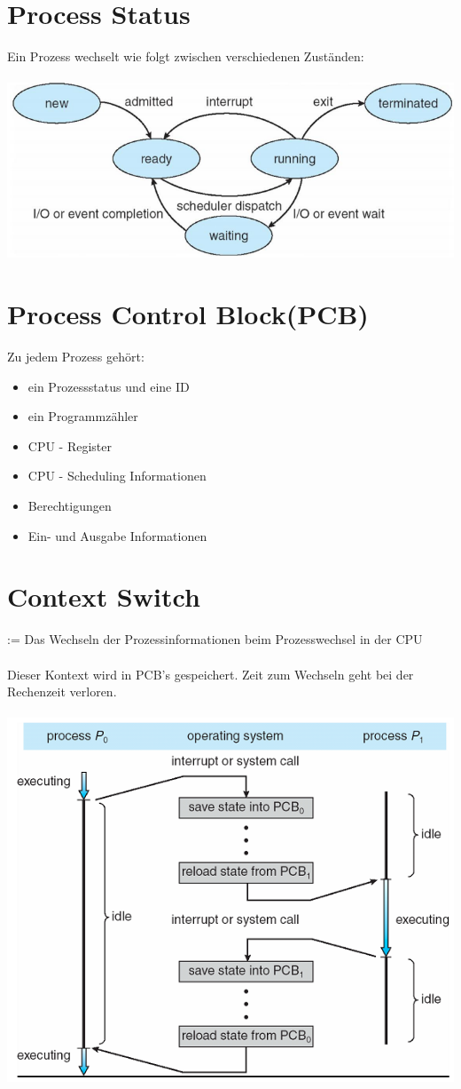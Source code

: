 \documentclass[a4paper]{scrreprt}
\begin{document}
\section{Process Status}
	Ein Prozess wechselt wie folgt zwischen verschiedenen Zuständen:\\ \\
	\includegraphics[scale = 0.4]{prozess_status.png}
\section{Process Control Block(PCB)}
	Zu jedem Prozess gehört:
	\begin{itemize}
		\item ein Prozessstatus und eine ID
		\item ein Programmzähler
		\item CPU - Register
		\item CPU - Scheduling Informationen
		\item Berechtigungen
		\item Ein- und Ausgabe Informationen
	\end{itemize}
\section{Context Switch}
	:= Das Wechseln der Prozessinformationen beim Prozesswechsel in der CPU\\ \\
	Dieser Kontext wird in PCB's gespeichert. Zeit zum Wechseln geht bei der Rechenzeit verloren.\\ \\
	\includegraphics[scale = 0.6]{process_switch.png}\\
\end{document}

